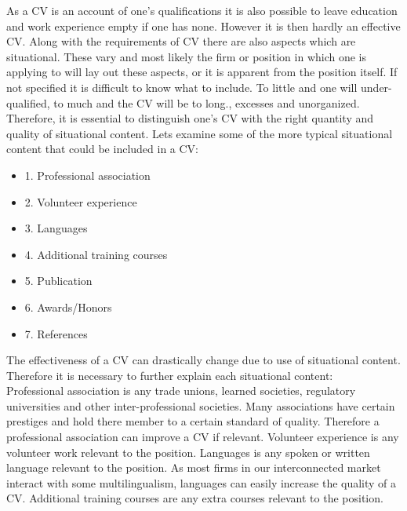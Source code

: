 As a CV is an account of one’s qualifications it is also possible to leave education and work experience empty if one has none.
However it is then hardly an effective CV.\cite{Difference_between_resume_and_curriculum_Vitae}
Along with the requirements of CV there are also aspects which are situational.
These vary and most likely the firm or position in which one is applying to will lay out these aspects, or it is apparent from the position itself.
If not specified it is difficult to know what to include. To little and one will under-qualified, to much and the CV will be to long.\cite{Job_Application_for_science}, excesses and unorganized.
Therefore, it is essential to distinguish one’s CV with the right quantity and quality of situational content.
Lets examine some of the more typical situational content that could be included in a CV: \\

\begin{itemize}
   \item 1. Professional association
   \item 2. Volunteer experience
   \item 3. Languages
   \item 4. Additional training courses
   \item 5. Publication
   \item 6. Awards/Honors
   \item 7. References\cite{6_sections} \\
\end{itemize}

The effectiveness of a CV can drastically change due to use of situational content.
Therefore it is necessary to further explain each situational content: \\
Professional association is any trade unions, learned societies, regulatory universities and other inter-professional societies.
Many associations have certain prestiges and hold there member to a certain standard of quality.
Therefore a professional association can improve a CV if relevant.\cite{Professional_associations_and_organizations}\cite{Perks_of_professional_organizations}
Volunteer experience is any volunteer work relevant to the position.
Languages is any spoken or written language relevant to the position.
As most firms in our interconnected market interact with some multilingualism, languages can easily increase the quality of a CV.
Additional training courses are any extra courses relevant to the position. \\

